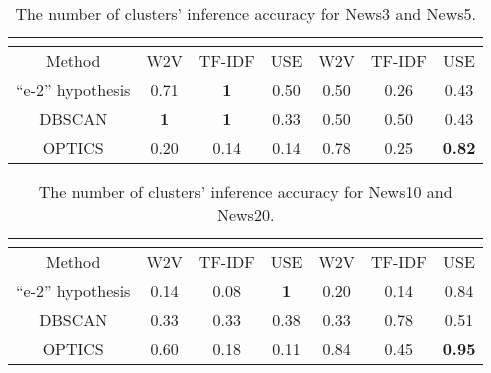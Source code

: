 \begin{table}[ht]%
	\centering
	\caption{The number of clusters’ inference accuracy for News3 and News5.}%
	\label{tab:clusterInfluence35}%
		\begin{tabular}{ c  c  c  c  c  c  c }%
			\toprule
			& \multicolumn{3}{c}{\makecell{News3}} & \multicolumn{3}{c}{\makecell{News5}}\\
			\hline
			Method & W2V & TF-IDF & USE & W2V & TF-IDF & USE \\
			\hline
			“e-2” hypothesis & 0.71 & \textbf{1} & 0.50 & 0.50 & 0.26 & 0.43 \\
			DBSCAN & \textbf{1} & \textbf{1} & 0.33 & 0.50 & 0.50 & 0.43  \\
			OPTICS & 0.20 & 0.14 & 0.14 & 0.78 & 0.25 & \textbf{0.82}\\
			\bottomrule
		\end{tabular}%
\end{table}

\begin{table}[ht]%
	\centering
	\caption{The number of clusters’ inference accuracy for News10 and News20.}%
	\label{tab:clusterInfluence1020}%
		\begin{tabular}{ c  c  c  c  c  c  c }%
			\toprule
			& \multicolumn{3}{c}{\makecell{News3}} & \multicolumn{3}{c}{\makecell{News5}}\\
			\hline
			Method & W2V & TF-IDF & USE & W2V & TF-IDF & USE \\
			\hline
			“e-2” hypothesis & 0.14 & 0.08 & \textbf{1} & 0.20 & 0.14 & 0.84 \\
			DBSCAN & 0.33 & 0.33 & 0.38 & 0.33 & 0.78 & 0.51  \\
			OPTICS & 0.60 & 0.18 & 0.11 & 0.84 & 0.45 & \textbf{0.95} \\
			\bottomrule
		\end{tabular}%
\end{table}

